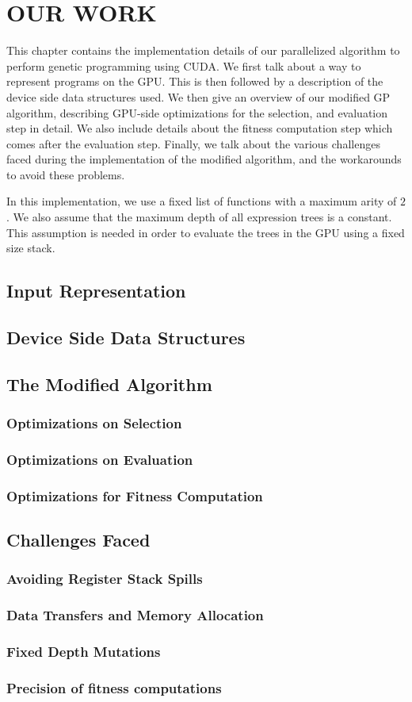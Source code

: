 \chapter{OUR WORK}
\label{chap:ourwork}
This chapter contains the implementation details of our parallelized algorithm to perform genetic programming using CUDA. We first talk about a way to represent programs on the GPU. This is then followed by a description of the device side data structures used. We then give an overview of our modified GP algorithm, describing GPU-side optimizations for the selection, and evaluation step in detail. We also include details about the fitness computation step which comes after the evaluation step. Finally, we talk about the various challenges faced during the implementation of the modified algorithm, and the workarounds to avoid these problems.

In this implementation, we use a fixed list of functions with a maximum arity of $2$. We also assume that the maximum depth of all expression trees is a constant. This assumption is needed in order to evaluate the trees in the GPU using a fixed size stack.
\section{Input Representation}
\section{Device Side Data Structures}
\section{The Modified Algorithm}

\subsection{Optimizations on Selection}
\subsection{Optimizations on Evaluation}
\subsection{Optimizations for Fitness Computation}

\section{Challenges Faced}
\subsection{Avoiding Register Stack Spills}
\subsection{Data Transfers and Memory Allocation}
\subsection{Fixed Depth Mutations}
\subsection{Precision of fitness computations}




